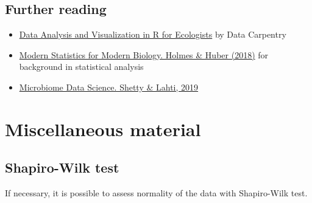 \documentclass[
]{book}
\newenvironment{Shaded}{\begin{snugshade}}{\end{snugshade}}
\newcommand{\CommentTok}[1]{\textcolor[rgb]{0.56,0.35,0.01}{\textit{#1}}}
\newcommand{\ControlFlowTok}[1]{\textcolor[rgb]{0.13,0.29,0.53}{\textbf{#1}}}
\newcommand{\FloatTok}[1]{\textcolor[rgb]{0.00,0.00,0.81}{#1}}
\newcommand{\FunctionTok}[1]{\textcolor[rgb]{0.00,0.00,0.00}{#1}}
\newcommand{\NormalTok}[1]{#1}
\newcommand{\OtherTok}[1]{\textcolor[rgb]{0.56,0.35,0.01}{#1}}
\newcommand{\SpecialCharTok}[1]{\textcolor[rgb]{0.00,0.00,0.00}{#1}}
\newcommand{\StringTok}[1]{\textcolor[rgb]{0.31,0.60,0.02}{#1}}
\begin{document}
\hypertarget{further-reading}{%
\section{Further reading}\label{further-reading}}

\begin{itemize}
\item
  \href{https://datacarpentry.org/R-ecology-lesson/}{Data Analysis and Visualization in R for Ecologists} by Data Carpentry
\item
  \href{http://web.stanford.edu/class/bios221/book/}{Modern Statistics for Modern Biology. Holmes \& Huber (2018)} for background in statistical analysis
\item
  \href{https://openresearchlabs.github.io/publications/papers/2018-Shetty-Lahti-MDS.pdf}{Microbiome Data Science. Shetty \& Lahti, 2019}
\end{itemize}

\hypertarget{miscellaneous-material}{%
\chapter{Miscellaneous material}\label{miscellaneous-material}}

\hypertarget{shapiro-wilk-test}{%
\section{Shapiro-Wilk test}\label{shapiro-wilk-test}}

If necessary, it is possible to assess normality of the data with Shapiro-Wilk test.

\begin{Shaded}
\end{Shaded}
\end{document}
